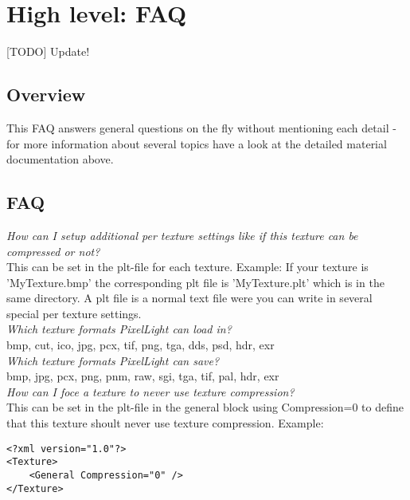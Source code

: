 \chapter{High level: \ac{FAQ}}


[TODO] Update!



\section{Overview}
This \ac{FAQ} answers general questions on the fly without mentioning each detail - for more information
about several topics have a look at the detailed material documentation above.\\




\section{\ac{FAQ}}


\emph{How can I setup additional per texture settings like if this texture can be compressed or not?}\\
This can be set in the plt-file for each texture. Example: If your texture is 'MyTexture.bmp' the
corresponding plt file is 'MyTexture.plt' which is in the same directory. A plt file is a normal
text file were you can write in several special per texture settings.\\


\emph{Which texture formats PixelLight can load in?}\\
bmp, cut, ico, jpg, pcx, tif, png, tga, dds, psd, hdr, exr\\


\emph{Which texture formats PixelLight can save?}\\
bmp, jpg, pcx, png, pnm, raw, sgi, tga, tif, pal, hdr, exr\\


\emph{How can I foce a texture to never use texture compression?}\\
This can be set in the plt-file in the general block using Compression=0 to define that this
texture shoult never use texture compression. Example:\\

\begin{lstlisting}[caption=plt-file disable texture compression]
<?xml version="1.0"?>
<Texture>
	<General Compression="0" />
</Texture>
\end{lstlisting}


